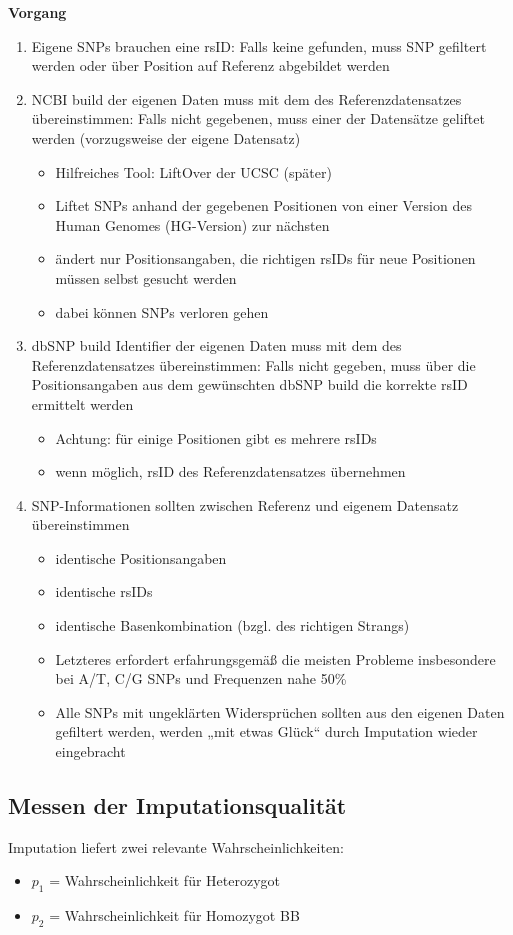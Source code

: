 \textbf{Vorgang}
\begin{enumerate}
	\item Eigene SNPs brauchen eine rsID: Falls keine gefunden, muss SNP gefiltert werden oder über Position auf Referenz abgebildet werden
	\item NCBI build der eigenen Daten muss mit dem des
Referenzdatensatzes übereinstimmen: Falls nicht gegebenen, muss einer der Datensätze geliftet werden (vorzugsweise der eigene Datensatz)
	\begin{itemize}
		\item Hilfreiches Tool: LiftOver der UCSC (später)
		\item Liftet SNPs anhand der gegebenen Positionen von einer Version des Human Genomes (HG-Version) zur nächsten
		\item ändert nur Positionsangaben, die richtigen rsIDs für neue Positionen müssen selbst gesucht werden
		\item dabei können SNPs verloren gehen
	\end{itemize}
	\item dbSNP build Identifier der eigenen Daten muss mit dem des Referenzdatensatzes übereinstimmen: Falls nicht gegeben, muss über die Positionsangaben aus dem gewünschten dbSNP build die korrekte rsID ermittelt werden
	\begin{itemize}
		\item Achtung: für einige Positionen gibt es mehrere rsIDs
		\item wenn möglich, rsID des Referenzdatensatzes übernehmen
	\end{itemize}
	\item SNP-Informationen sollten zwischen Referenz und eigenem Datensatz übereinstimmen
	\begin{itemize}
		\item identische Positionsangaben
		\item identische rsIDs
		\item identische Basenkombination (bzgl. des richtigen Strangs)
		\item Letzteres erfordert erfahrungsgemäß die meisten Probleme insbesondere bei A/T, C/G SNPs und Frequenzen nahe 50\%
		\item Alle SNPs mit ungeklärten Widersprüchen sollten aus den eigenen Daten gefiltert werden, werden „mit etwas Glück“ durch Imputation wieder eingebracht
	\end{itemize}
\end{enumerate}

\subsection{Messen der Imputationsqualität}
Imputation liefert zwei relevante Wahrscheinlichkeiten:
\begin{itemize}
	\item $p_1$ = Wahrscheinlichkeit für Heterozygot
	\item $p_2$ = Wahrscheinlichkeit für Homozygot BB
\end{itemize}

